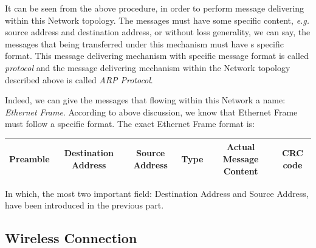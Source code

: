 \documentclass[10pt,a4paper]{article}
\begin{document}
It can be seen from the above procedure, in order to perform message delivering within this Network topology. The messages must have some specific content, \textsl{e.g.} source address and destination address, or without loss generality, we can say, the messages that being transferred under this mechanism must have s specific format. This message delivering mechanism with specific message format is called \textit{protocol} and the message delivering mechanism within the Network topology described above is called \textit{ARP Protocol}. 

Indeed, we can give the messages that flowing within this Network a name: \textit{Ethernet Frame}. According to above discussion, we know that Ethernet Frame must follow a specific format. The exact Ethernet Frame format is:
\begin{center}
	\begin{tabular}{|c|c|c|c|c|c|}
		\hline
		Preamble & Destination Address & Source Address & Type & Actual Message Content & CRC code \\
		\hline
	\end{tabular}
\end{center}
In which, the most two important field: Destination Address and Source Address, have been introduced in the previous part.

\subsection{Wireless Connection}
\end{document}
